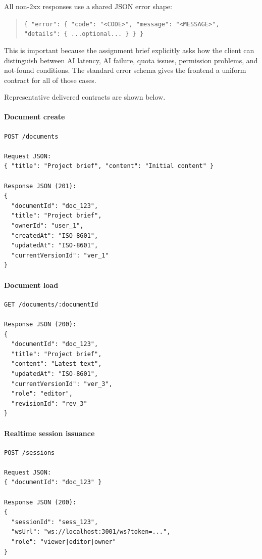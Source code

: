All non-2xx responses use a shared JSON error shape:

\begin{quote}
\texttt{\{ "error": \{ "code": "<CODE>", "message": "<MESSAGE>", "details": \{ ...optional... \} \} \}}
\end{quote}

This is important because the assignment brief explicitly asks how the client can distinguish between AI
latency, AI failure, quota issues, permission problems, and not-found conditions. The standard error
schema gives the frontend a uniform contract for all of those cases.

Representative delivered contracts are shown below.

\paragraph{Document create}
\begin{lstlisting}[language={}]
POST /documents

Request JSON:
{ "title": "Project brief", "content": "Initial content" }

Response JSON (201):
{
  "documentId": "doc_123",
  "title": "Project brief",
  "ownerId": "user_1",
  "createdAt": "ISO-8601",
  "updatedAt": "ISO-8601",
  "currentVersionId": "ver_1"
}
\end{lstlisting}

\paragraph{Document load}
\begin{lstlisting}[language={}]
GET /documents/:documentId

Response JSON (200):
{
  "documentId": "doc_123",
  "title": "Project brief",
  "content": "Latest text",
  "updatedAt": "ISO-8601",
  "currentVersionId": "ver_3",
  "role": "editor",
  "revisionId": "rev_3"
}
\end{lstlisting}

\paragraph{Realtime session issuance}
\begin{lstlisting}[language={}]
POST /sessions

Request JSON:
{ "documentId": "doc_123" }

Response JSON (200):
{
  "sessionId": "sess_123",
  "wsUrl": "ws://localhost:3001/ws?token=...",
  "role": "viewer|editor|owner"
}
\end{lstlisting}

